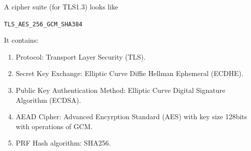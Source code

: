\documentclass[a4paper, 12pt]{book} %
\begin{document}
A cipher suite (for TLS1.3) looks like
\begin{center}
    \verb|TLS_AES_256_GCM_SHA384|
\end{center}
It contains:
\begin{enumerate}
    \item Protocol: Transport Layer Security (TLS).
    \item Secret Key Exchange: Elliptic Curve Diffie Hellman Ephemeral (ECDHE).
    \item Public Key Authentication Method: Elliptic Curve Digital Signature Algorithm (ECDSA).
    \item AEAD Cipher: Advanced Encyrption Standard (AES) with key size 128bits with operations of GCM.
    \item PRF Hash algorithm: SHA256.
\end{enumerate}












\cite{adamson2012set}







\printindex
\end{document}

